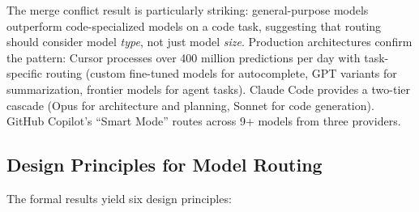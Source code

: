 The merge conflict result \citep{zhu2024congra} is particularly striking: general-purpose models outperform code-specialized models on a code task, suggesting that routing should consider model \emph{type}, not just model \emph{size}. Production architectures confirm the pattern: Cursor processes over 400 million predictions per day with task-specific routing (custom fine-tuned models for autocomplete, GPT variants for summarization, frontier models for agent tasks). Claude Code provides a two-tier cascade (Opus for architecture and planning, Sonnet for code generation). GitHub Copilot's ``Smart Mode'' routes across 9+ models from three providers.

\subsection{Design Principles for Model Routing}

The formal results yield six design principles:


